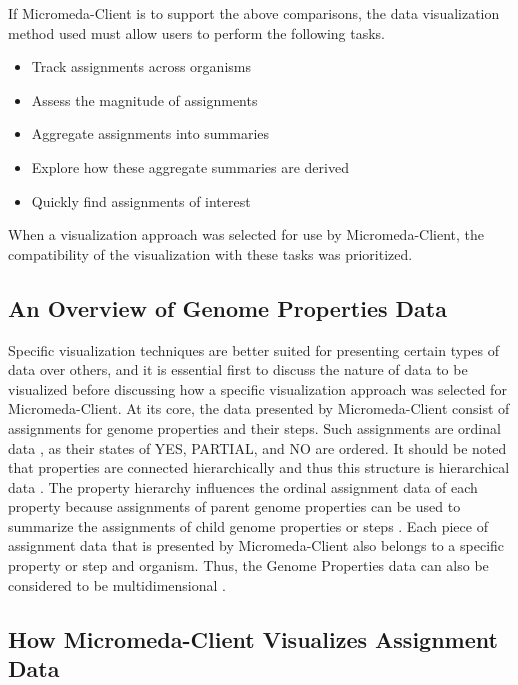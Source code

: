 If Micromeda-Client is to support the above comparisons, the data visualization 
method used must allow users to perform the following tasks.

\begin{itemize}
\item Track assignments across organisms
\item Assess the magnitude of assignments
\item Aggregate assignments into summaries
\item Explore how these aggregate summaries are derived
\item Quickly find assignments of interest
\end{itemize}

When a visualization approach was selected for use by Micromeda-Client, the 
compatibility of the visualization with these tasks was prioritized.

\subsection{An Overview of Genome Properties Data}

Specific visualization techniques are better suited for presenting certain types 
of data over others, and it is essential first to discuss the nature of data to 
be visualized before discussing how a specific visualization approach was 
selected for Micromeda-Client. At its core, the data presented by 
Micromeda-Client consist of assignments for genome properties and their steps. 
Such assignments are ordinal data 
\cite{richardson2018genome,agresti2010analysis}, as their states of YES, 
PARTIAL, and NO are ordered. It should be noted that properties are connected 
hierarchically \cite{richardson2018genome} and thus this structure is 
hierarchical data \cite{richardson2018genome,samet1990applications}. The 
property hierarchy influences the ordinal assignment data of each property 
because assignments of parent genome properties can be used to summarize the 
assignments of child genome properties or steps \cite{richardson2018genome}. 
Each piece of assignment data that is presented by Micromeda-Client also belongs 
to a specific property or step and organism. Thus, the Genome Properties data 
can also be considered to be multidimensional 
\cite{pedersen1999multidimensional}.

\subsection{How Micromeda-Client Visualizes Assignment Data}

